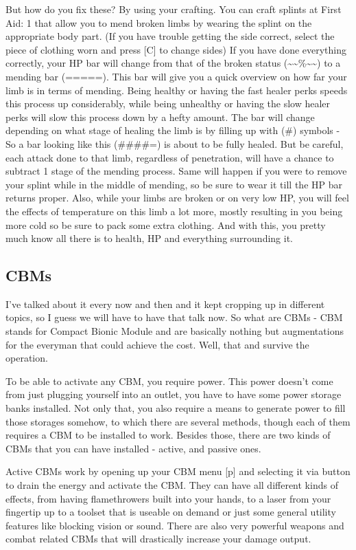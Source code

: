 But how do you fix these? By using your crafting. You can craft splints at First Aid: 1 that allow you to mend broken limbs by wearing the splint on the appropriate body part. (If you have trouble getting the side correct, select the piece of clothing worn and press [C] to change sides) If you have done everything correctly, your HP bar will change from that of the broken status (\~{}\~{}\%\~{}\~{}) to a mending bar (=====). This bar will give you a quick overview on how far your limb is in terms of mending. Being healthy or having the fast healer perks speeds this process up considerably, while being unhealthy or having the slow healer perks will slow this process down by a hefty amount. The bar will change depending on what stage of healing the limb is by filling up with (\#) symbols - So a bar looking like this (\#\#\#\#=) is about to be fully healed. But be careful, each attack done to that limb, regardless of penetration, will have a chance to subtract 1 stage of the mending process. Same will happen if you were to remove your splint while in the middle of mending, so be sure to wear it till the HP bar returns proper. Also, while your limbs are broken or on very low HP, you will feel the effects of temperature on this limb a lot more, mostly resulting in you being more cold so be sure to pack some extra clothing. And with this, you pretty much know all there is to health, HP and everything surrounding it.

\subsection{CBMs}

I've talked about it every now and then and it kept cropping up in different topics, so I guess we will have to have that talk now. So what are CBMs - CBM stands for Compact Bionic Module and are basically nothing but augmentations for the everyman that could achieve the cost. Well, that and survive the operation.

To be able to activate any CBM, you require power. This power doesn't come from just plugging yourself into an outlet, you have to have some power storage banks installed. Not only that, you also require a means to generate power to fill those storages somehow, to which there are several methods, though each of them requires a CBM to be installed to work. Besides those, there are two kinds of CBMs that you can have installed - active, and passive ones.

Active CBMs work by opening up your CBM menu [p] and selecting it via button to drain the energy and activate the CBM. They can have all different kinds of effects, from having flamethrowers built into your hands, to a laser from your fingertip up to a toolset that is useable on demand or just some general utility features like blocking vision or sound. There are also very powerful weapons and combat related CBMs that will drastically increase your damage output.

